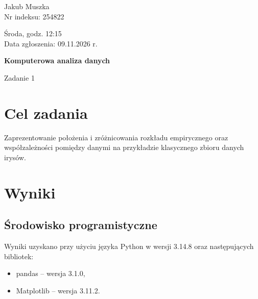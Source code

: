 \documentclass[12pt,a4paper]{article}
\begin{document}

\noindent
\begin{minipage}[t]{0.48\textwidth}
    \raggedright
    Jakub Muszka \\
    Nr indeksu: 254822
\end{minipage}
\hfill
\begin{minipage}[t]{0.48\textwidth}
    \raggedleft
    Środa, godz. 12:15 \\
    Data zgłoszenia: 09.11.2026 r.
\end{minipage}

\vspace{0.8cm}

\begin{center}
    {\LARGE\bfseries Komputerowa analiza danych}

    \vspace{0.3cm}

    {\large Zadanie 1}
\end{center}

\vspace{0.5cm}


\section{Cel zadania}

Zaprezentowanie położenia i zróżnicowania rozkładu
empirycznego oraz współzależności pomiędzy danymi
na przykładzie klasycznego zbioru danych irysów.


\section{Wyniki}

\subsection{Środowisko programistyczne}

Wyniki uzyskano przy użyciu języka Python
w wersji 3.14.8 oraz następujących bibliotek:

\begin{itemize}
    \item pandas -- wersja 3.1.0,
    \item Matplotlib -- wersja 3.11.2.
\end{itemize}
\end{document}
